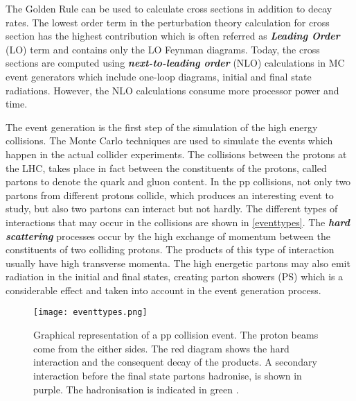 The Golden Rule can be used to calculate cross sections in addition to decay rates. The lowest order term in the perturbation theory calculation for cross section has the highest contribution which is often referred as \emph{\textbf{Leading Order}} (LO) term and contains only the LO Feynman diagrams. Today, the cross sections are computed using \emph{\textbf{next-to-leading order}} (NLO) calculations in MC event generators which include one-loop diagrams, initial and final state radiations. However, the NLO calculations consume more processor power and time. 

The event generation is the first step of the simulation of the high energy collisions. The Monte Carlo techniques are used to simulate the events which happen in the actual collider experiments. The collisions between the protons at the LHC, takes place in fact between the constituents of the protons, called partons to denote the quark and gluon content. In the pp collisions, not only two partons from different protons collide, which produces an interesting event to study, but also two partons can interact but not hardly. The different types of interactions that may occur in the collisions are shown in \autoref{eventtypes}. The \emph{\textbf{hard scattering}} processes occur by the high exchange of momentum between the constituents of two colliding protons. The products of this type of interaction usually have high transverse momenta. The high energetic partons may also emit radiation in the initial and final states, creating parton showers (PS) which is a considerable effect and taken into account in the event generation process.

\begin{figure}[ht]
	\centering
	\texttt{[image: eventtypes.png]}
	\vspace{2mm}
	\caption[Graphical representation of a pp collision event. The proton beams come from the either sides. The red diagram shows the hard interaction and the consequent decay of the products. A secondary interaction before the final state partons hadronise, is shown in purple. The hadronisation is indicated in green.]
	{Graphical representation of a pp collision event. The proton beams come from the either sides. The red diagram shows the hard interaction and the consequent decay of the products. A secondary interaction before the final state partons hadronise, is shown in purple. The hadronisation is indicated in green \cite{Pttgen2016}.}
	\label{eventtypes}
\end{figure}

